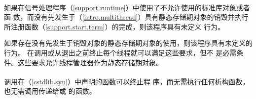 \paragraph{} %
如果在信号处理程序（\ref{support.runtime}）中使用了不允许使用的标准库对象或者函
数，而没有先发生于（\ref{intro.multithread}）具有静态存储期对象的销毁并执行
所注册函数（\ref{support.start.term}）的完成，则该程序具有未定义
行为。

\begin{note}
  如果存在没有先发生于销毁对象的静态存储期对象的使用，则该程序具有未定义的行为。
  在调用或从退出之前终止每个线程就可以满足这些要求，但不
  是必需条件。这些要求允许线程管理器作为静态存储期对象。
\end{note}

\paragraph{} %
调用在（\ref{cstdlib.syn}）中声明的函数可以终止程
序，而无需执行任何析构函数，也无需调用传递给或
的函数。
